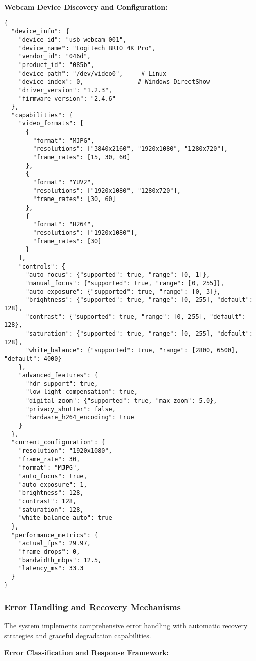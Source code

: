 \documentclass[11pt,a4paper]{article}
\begin{document}
\textbf{Webcam Device Discovery and Configuration:}

\begin{verbatim}
{
  "device_info": {
    "device_id": "usb_webcam_001",
    "device_name": "Logitech BRIO 4K Pro",
    "vendor_id": "046d",
    "product_id": "085b",
    "device_path": "/dev/video0",     # Linux
    "device_index": 0,               # Windows DirectShow
    "driver_version": "1.2.3",
    "firmware_version": "2.4.6"
  },
  "capabilities": {
    "video_formats": [
      {
        "format": "MJPG",
        "resolutions": ["3840x2160", "1920x1080", "1280x720"],
        "frame_rates": [15, 30, 60]
      },
      {
        "format": "YUV2",
        "resolutions": ["1920x1080", "1280x720"],
        "frame_rates": [30, 60]
      },
      {
        "format": "H264",
        "resolutions": ["1920x1080"],
        "frame_rates": [30]
      }
    ],
    "controls": {
      "auto_focus": {"supported": true, "range": [0, 1]},
      "manual_focus": {"supported": true, "range": [0, 255]},
      "auto_exposure": {"supported": true, "range": [0, 3]},
      "brightness": {"supported": true, "range": [0, 255], "default": 128},
      "contrast": {"supported": true, "range": [0, 255], "default": 128},
      "saturation": {"supported": true, "range": [0, 255], "default": 128},
      "white_balance": {"supported": true, "range": [2800, 6500], "default": 4000}
    },
    "advanced_features": {
      "hdr_support": true,
      "low_light_compensation": true,
      "digital_zoom": {"supported": true, "max_zoom": 5.0},
      "privacy_shutter": false,
      "hardware_h264_encoding": true
    }
  },
  "current_configuration": {
    "resolution": "1920x1080",
    "frame_rate": 30,
    "format": "MJPG",
    "auto_focus": true,
    "auto_exposure": 1,
    "brightness": 128,
    "contrast": 128,
    "saturation": 128,
    "white_balance_auto": true
  },
  "performance_metrics": {
    "actual_fps": 29.97,
    "frame_drops": 0,
    "bandwidth_mbps": 12.5,
    "latency_ms": 33.3
  }
}
\end{verbatim}

\subsubsection{Error Handling and Recovery Mechanisms}

The system implements comprehensive error handling with automatic recovery strategies and graceful degradation
capabilities.

\textbf{Error Classification and Response Framework:}
\end{document}
